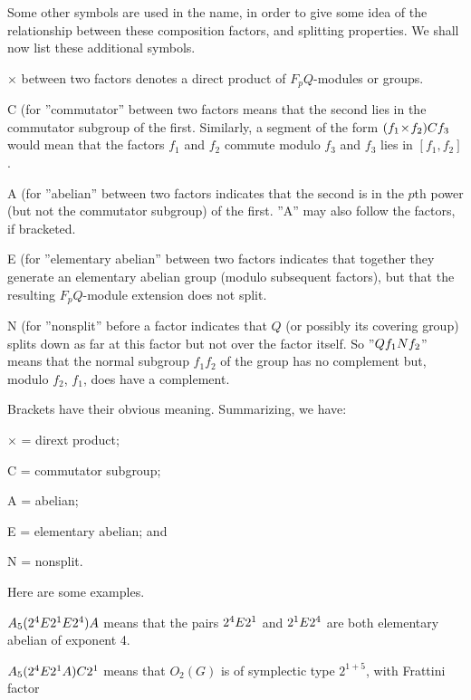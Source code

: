 {Some  other symbols are used  in the name, in order  to give some idea of
the   relationship  between these    composition  factors, and  splitting
properties. We shall now list these additional symbols.
{\parindent\manindent
\item{$\times$}  between  two  factors   denotes   a  direct  product  of
      $F_pQ$-modules or groups.
\item{C} (for ''commutator''  between two factors  means  that the second
      lies in the commutator subgroup of the first.  Similarly, a segment
      of the form  $(f_1 \! \times \! f_2) {\sl C} f_3$  would mean  that
      the factors $f_1$ and $f_2$  commute modulo $f_3$ and $f_3$ lies in
      $[f_1,f_2]$.
\item{A} (for ''abelian''  between two factors  indicates that the second
      is  in the  $p$th  power  (but not the commutator subgroup)  of the
      first.   ''A''   may  also   follow  the  factors,   if  bracketed.
\item{E} (for ''elementary abelian''  between two factors  indicates that
      together   they  generate  an  elementary  abelian  group   (modulo
      subsequent factors), but that the resulting $F_pQ$-module extension
      does not split.
\item{N}  (for ''nonsplit''  before  a  factor  indicates  that  $Q$  (or
      possibly its covering group)  splits down as far at this factor but
      not over the factor itself.  So  ''$Q f_1 {\sl N} f_2$'' means that
      the normal subgroup  $f_1f_2$  of the group  has no complement but,
      modulo $f_2$, $f_1$, does have a complement.
\par}
Brackets have their obvious meaning. Summarizing, we have:
{\parindent\manindent
\item{$\times$} = dirext product;
\item{C} = commutator subgroup;
\item{A} = abelian;
\item{E} = elementary abelian; and
\item{N} = nonsplit.
\par}
Here are some examples.
{\parindent\manindent
\item[(i)]  $A_5 (2^4 {\sl E} 2^1 {\sl E} 2^4) {\sl A}$  means  that  the
      pairs  $2^4 {\sl E} 2^1$  and $2^1 {\sl E} 2^4$ are both elementary
      abelian of exponent 4.
\item[(ii)]   $A_5 (2^4 {\sl E} 2^1 {\sl A}) {\sl C} 2^1$    means   that
      $O_2(G)$  is of  symplectic type  $2^{1+5}$,  with  Frattini factor
}}
